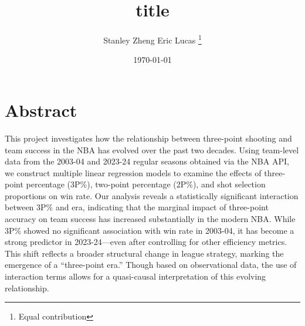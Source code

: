 \documentclass[11pt, a4paper]{article} %
\title{title} %
\author{
Stanley Zheng \space Eric \space Lucas
    \thanks{Equal contribution} %
  }
\date{\small \today} %
\begin{document}
%

\maketitle %


\setcounter{page}{1} %
\section{Abstract} %
This project investigates how the relationship between three-point shooting and team success 
in the NBA has evolved over the past two decades. Using team-level data from the 2003-04 and 
2023-24 regular seasons obtained via the NBA API, we construct multiple linear regression 
models to examine the effects of three-point percentage (3P\%), two-point percentage (2P\%), 
and shot selection proportions on win rate. Our analysis reveals a statistically significant 
interaction between 3P\% and era, indicating that the marginal impact of three-point accuracy 
on team success has increased substantially in the modern NBA. While 3P\% showed no significant 
association with win rate in 2003-04, it has become a strong predictor in 2023-24—even after 
controlling for other efficiency metrics. This shift reflects a broader structural change in 
league strategy, marking the emergence of a “three-point era.” Though based on observational 
data, the use of interaction terms allows for a quasi-causal interpretation of this evolving 
relationship.
\end{document}
